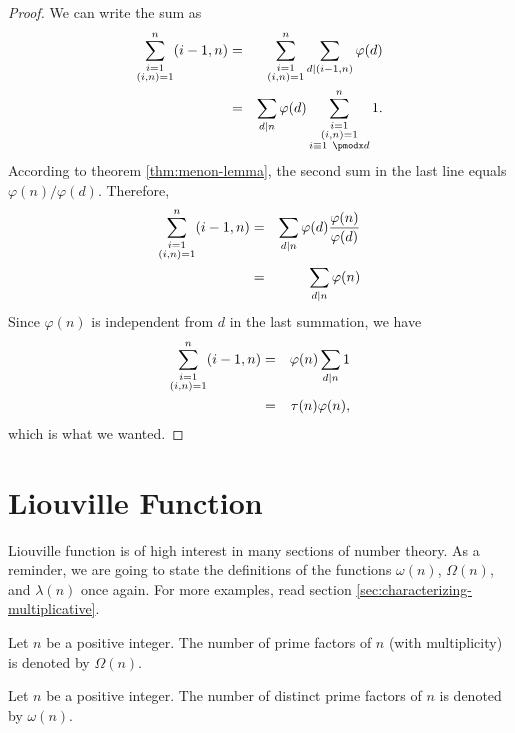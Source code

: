\documentclass[12pt]{subfile}
\begin{document}
		\begin{proof}
			We can write the sum as
				\begin{eqnarray*}
					\sum\limits_{\substack{i=1\\(i,n)=1}}^{n}(i-1,n) 
					& = & \sum\limits_{\substack{i=1\\(i,n)=1}}^{n}\sum\limits_{d\mid(i-1,n)}\t (d)\\
					& = & \sum\limits_{d|n}\t (d)\sum\limits_{\substack{i=1\\(i,n)=1\\i\equiv 1\pmod d}}^n 1.
				\end{eqnarray*}
			According to theorem \eqref{thm:menon-lemma}, the second sum in the last line equals $\varphi(n)/\varphi(d)$. Therefore,
				\begin{eqnarray*}
					\sum\limits_{\substack{i=1\\(i,n)=1}}^{n}(i-1,n) 
					& = & \sum\limits_{d|n}\varphi (d)\dfrac{\varphi (n)}{\varphi (d)}\\
					& = & \sum\limits_{d|n}\varphi (n)
				\end{eqnarray*}
			Since $\varphi(n)$ is independent from $d$ in the last summation, we have
				\begin{eqnarray*}
					\sum\limits_{\substack{i=1\\(i,n)=1}}^{n}(i-1,n) 
					& = & \varphi(n)\sum\limits_{d|n}1\\
					& = & \tau(n)\varphi (n),
				\end{eqnarray*}
			which is what we wanted.
		\end{proof}
\section{Liouville Function}
	Liouville function is of high interest in many sections of number theory. As a reminder, we are going to state the definitions of the functions $\omega(n)$, $\Omega(n)$, and $\lambda(n)$ once again. For more examples, read section \eqref{sec:characterizing-multiplicative}.
	
	\begin{definition}
		Let $n$ be a positive integer. The number of prime factors of $n$ (with multiplicity) is denoted by $\Omega(n)$.
	\end{definition}
	
	\begin{definition}
		Let $n$ be a positive integer. The number of distinct prime factors of $n$ is denoted by $\omega(n)$.
	\end{definition}
	
\end{document}
